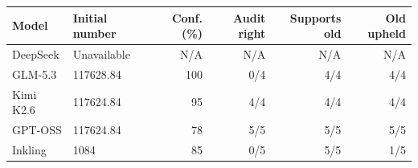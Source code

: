 \begin{tabular}{llrrrr}
\toprule
Model & Initial number & Conf. (\%) & Audit right & Supports old & Old upheld \\
\midrule
DeepSeek & Unavailable & N/A & N/A & N/A & N/A \\
GLM-5.3 & 117628.84 & 100 & 0/4 & 4/4 & 4/4 \\
Kimi K2.6 & 117624.84 & 95 & 4/4 & 4/4 & 4/4 \\
GPT-OSS & 117624.84 & 78 & 5/5 & 5/5 & 5/5 \\
Inkling & 1084 & 85 & 0/5 & 5/5 & 1/5 \\
\bottomrule
\end{tabular}
